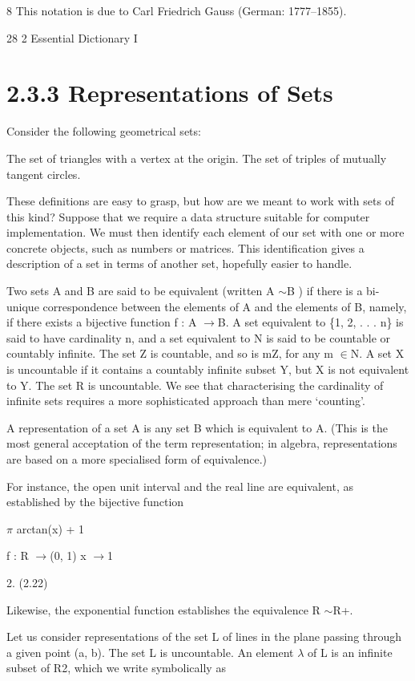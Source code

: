 \documentclass[11pt]{article}
\theoremstyle{plain}
\theoremstyle{definition}
\begin{document}
8 This notation is due to Carl Friedrich Gauss (German: 1777--1855).

28 2 Essential Dictionary I

\section{2.3.3 Representations of Sets}

Consider the following geometrical sets:

The set of triangles with a vertex at the origin. The set of triples of mutually tangent circles.

These definitions are easy to grasp, but how are we meant to work with sets of this kind? Suppose that we require a data structure suitable for computer implementation. We must then identify each element of our set with one or more concrete objects, such as numbers or matrices. This identification gives a description of a set in terms of another set, hopefully easier to handle.

Two sets A and B are said to be equivalent (written A $\sim$B ) if there is a bi-unique correspondence between the elements of A and the elements of B, namely, if there exists a bijective function f : A $\to$B. A set equivalent to \{1, 2, . . . n\} is said to have cardinality n, and a set equivalent to N is said to be countable or countably infinite. The set Z is countable, and so is mZ, for any m $\in$N. A set X is uncountable if it contains a countably infinite subset Y, but X is not equivalent to Y. The set R is uncountable. We see that characterising the cardinality of infinite sets requires a more sophisticated approach than mere `counting'.

A representation of a set A is any set B which is equivalent to A. (This is the most general acceptation of the term representation; in algebra, representations are based on a more specialised form of equivalence.)

For instance, the open unit interval and the real line are equivalent, as established by the bijective function

$\pi$ arctan(x) + 1

f : R $\to$(0, 1) x $\to$1

2. (2.22)

Likewise, the exponential function establishes the equivalence R $\sim$R+.

Let us consider representations of the set L of lines in the plane passing through a given point (a, b). The set L is uncountable. An element $\lambda$ of L is an infinite subset of R2, which we write symbolically as
\end{document}
